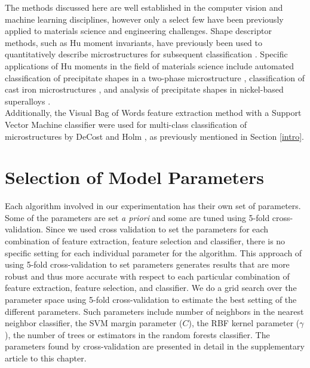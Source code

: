The methods discussed here are well established in the computer vision and machine learning disciplines, however only a select few have been previously applied to materials science and engineering challenges.  Shape descriptor methods, such as Hu moment invariants, have previously been used to quantitatively describe microstructures for subsequent classification \cite{Pattan2010, Prakash2011, Kumara,MacSleyne2008,Sluytman2012}.  
%
Specific applications of Hu moments in the field of materials science include automated classification of precipitate shapes in a two-phase microstructure \cite{MacSleyne2008}, classification of cast iron microstructures \cite{Pattan2010,Prakash2011,Kumara}, and analysis of precipitate shapes in nickel-based superalloys \cite{Sluytman2012}.\\

%
Additionally, the Visual Bag of Words feature extraction method with a Support Vector Machine classifier were used for multi-class classification of microstructures by DeCost and Holm \cite{DeCost2015}, as previously mentioned in Section \ref{intro}. 

\section{Selection of Model Parameters}
Each algorithm involved in our experimentation has their own set of parameters. Some of the parameters are set \textit{a priori} and some are tuned using 5-fold cross-validation. Since we used cross validation to set the parameters for each combination of feature extraction, feature selection and classifier, there is no specific setting for each individual parameter for the algorithm. This approach of using 5-fold cross-validation to set parameters generates results that are more robust and thus more accurate with respect to each particular combination of feature extraction, feature selection, and classifier. We do a grid search over the parameter space using 5-fold cross-validation to estimate the best setting of the different parameters. Such parameters include number of neighbors in the nearest neighbor classifier, the SVM margin parameter ($C$), the RBF kernel parameter  ($\gamma$), the number of trees or estimators in the random forests classifier. The parameters found by cross-validation are presented in detail in the supplementary article to this chapter.

